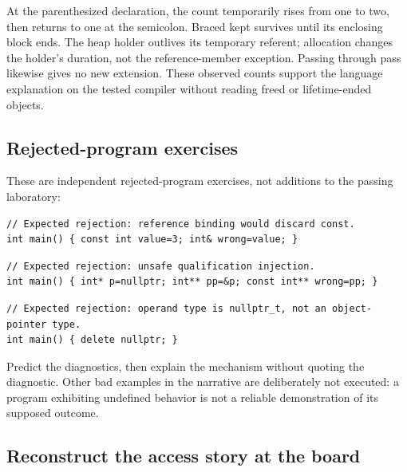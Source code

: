 At the parenthesized declaration, the count temporarily rises from one to two, then returns to one at the semicolon. Braced kept survives until its enclosing block ends. The heap holder outlives its temporary referent; allocation changes the holder's duration, not the reference-member exception. Passing through pass likewise gives no new extension. These observed counts support the language explanation on the tested compiler without reading freed or lifetime-ended objects.

\subsection{Rejected-program exercises}\label{05-engine-i-ch004-rejected-program-exercises}

These are independent rejected-program exercises, not additions to the passing laboratory:

\begin{verbatim}
// Expected rejection: reference binding would discard const.
int main() { const int value=3; int& wrong=value; }
\end{verbatim}

\begin{verbatim}
// Expected rejection: unsafe qualification injection.
int main() { int* p=nullptr; int** pp=&p; const int** wrong=pp; }
\end{verbatim}

\begin{verbatim}
// Expected rejection: operand type is nullptr_t, not an object-pointer type.
int main() { delete nullptr; }
\end{verbatim}

Predict the diagnostics, then explain the mechanism without quoting the diagnostic. Other bad examples in the narrative are deliberately not executed: a program exhibiting undefined behavior is not a reliable demonstration of its supposed outcome.

\subsection{Reconstruct the access story at the board}\label{05-engine-i-ch004-reconstruct-the-access-story-at-the-board}

